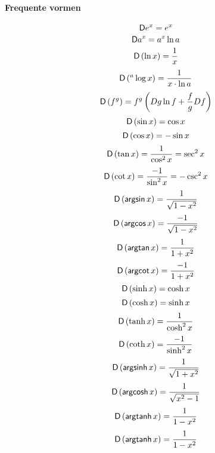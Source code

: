 \paragraph{Frequente vormen}
\[
  \;\textsf{D} e^x = e^x
\]
\[
  \;\textsf{D} a^x = a^x \ln a
\]
\[
  \;\textsf{D}\left(\ln x\right) = \frac{1}{x}
\]
\[
  \;\textsf{D}\left(^a \log x\right)= \frac{1}{x \cdot \ln a}
\]
\[
  \;\textsf{D}\left(f^g\right) = f^g \left( Dg \ln f + \frac{f}{g} Df \right)
\]
\newpage
\[
  \;\textsf{D}\left(\sin x\right) = \cos x
\]
\[
  \;\textsf{D}\left(\cos x\right) = -\sin x
\]
\[
  \;\textsf{D}\left(\tan x\right) = \frac{1}{\cos^2 x} = \sec^2 x
\]
\[
  \;\textsf{D}\left(\cot x\right) = \frac{ -1}{\sin^2 x} = - \csc^2 x
\]
\[
  \;\textsf{D}\left(\mbox{\textsf{argsin}}\, x\right) = \frac{1}{\sqrt{1-x^2}}
\]
\[
  \;\textsf{D}\left(\mbox{\textsf{argcos}}\, x\right) = \frac{-1}{\sqrt{1-x^2}}
\]
\[
  \;\textsf{D}\left(\mbox{\textsf{argtan}}\, x\right) = \frac{1}{1+x^2}
\]
\[
  \;\textsf{D}\left(\mbox{\textsf{argcot}}\, x\right) = \frac{-1}{1+x^2}
\]
\[
  \;\textsf{D}\left(\sinh x\right) = \cosh x 
\]
\[
  \;\textsf{D}\left(\cosh x\right) = \sinh x
\]
\[
  \;\textsf{D}\left(\tanh x\right) = \frac{1}{\cosh^2 x}
\]
\[
  \;\textsf{D}\left(\coth x\right) = \frac{-1}{\sinh^2 x}
\]
\[
  \;\textsf{D}\left(\mbox{\textsf{argsinh}}\, x\right) = \frac{1}{\sqrt{1 + x^2}}
\]
\[
  \;\textsf{D}\left(\mbox{\textsf{argcosh}}\, x\right) = \frac{1}{\sqrt{x^2 - 1}}
\]
\[
  \;\textsf{D}\left(\mbox{\textsf{argtanh}}\, x\right) = \frac{1}{1-x^2}
\]
\[
  \;\textsf{D}\left(\mbox{\textsf{argtanh}}\, x\right) = \frac{1}{1-x^2}
\]

\onecolumn